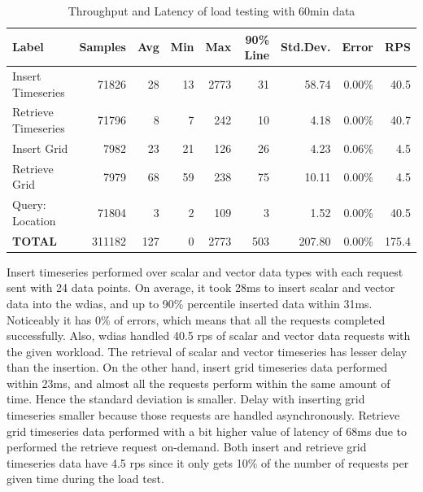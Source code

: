 \begin{table}[ht]
\caption{Throughput and Latency of load testing with 60min data}
\footnotesize
\begin{tabulary}{\linewidth}{|L|R|R|R|R|R|R|R|R|}
\hline
Label & Samples & Avg & Min & Max & 90\% Line & Std.Dev. & Error & RPS \\ \hline
Insert Timeseries & 71826 & 28 & 13 & 2773 & 31 & 58.74 & 0.00\% & 40.5 \\ \hline
Retrieve Timeseries & 71796 & 8 & 7 & 242 & 10 & 4.18 & 0.00\% & 40.7 \\ \hline
Insert Grid & 7982 & 23 & 21 & 126 & 26 & 4.23 & 0.06\% & 4.5 \\ \hline
Retrieve Grid & 7979 & 68 & 59 & 238 & 75 & 10.11 & 0.00\% & 4.5 \\ \hline
Query: Location & 71804 & 3 & 2 & 109 & 3 & 1.52 & 0.00\% & 40.5 \\ \hline
\textbf{TOTAL} & 311182 & 127 & 0 & 2773 & 503 & 207.80 & 0.00\% & 175.4 \\ \hline
\end{tabulary}
\label{tab:obs_all_60_min_summary}
\end{table}
Insert timeseries performed over scalar and vector data types with each request sent with 24 data points. On average, it took 28ms to insert scalar and vector data into the \acrshort{wdias}, and up to 90\% percentile inserted data within 31ms. Noticeably it has 0\% of errors, which means that all the requests completed successfully. Also, \acrshort{wdias} handled 40.5 \acrshort{rps} of scalar and vector data requests with the given workload. The retrieval of scalar and vector timeseries has lesser delay than the insertion.
On the other hand, insert grid timeseries data performed within 23ms, and almost all the requests perform within the same amount of time. Hence the standard deviation is smaller. Delay with inserting grid timeseries smaller because those requests are handled asynchronously. Retrieve grid timeseries data performed with a bit higher value of latency of 68ms due to performed the retrieve request on-demand. Both insert and retrieve grid timeseries data have 4.5 \acrshort{rps} since it only gets 10\% of the number of requests per given time during the load test.

